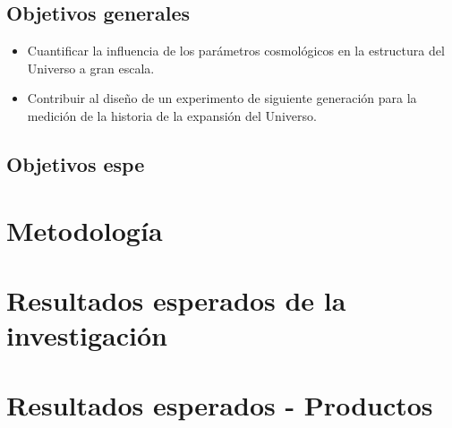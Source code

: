 \documentclass[12pt]{article}
\begin{document}
\subsection*{Objetivos generales} 

\begin{itemize}
\item  Cuantificar la influencia de los par\'ametros cosmol\'ogicos en la
  estructura del Universo a gran escala.
\item Contribuir al dise\~no de un experimento de siguiente
  generaci\'on para la medici\'on de la historia de la expansi\'on del
  Universo. 
\end{itemize}

\subsection{Objetivos espe}



\section{Metodolog\'ia}

\section{Resultados esperados de la investigaci\'on}

\section{Resultados esperados - Productos}
\end{document}
